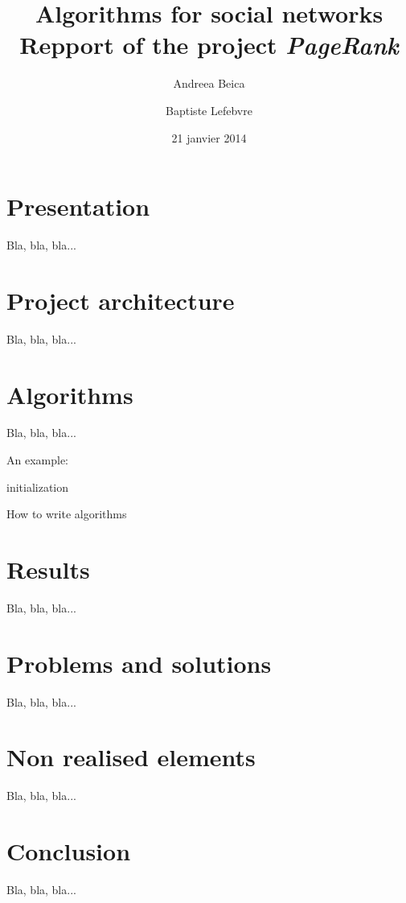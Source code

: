 \documentclass[pdftex,12pt,a4paper]{article}
\begin{document}
\title{
	\Large \textbf{Algorithms for social networks} \\
	\textsf{Repport of the project \emph{PageRank}}
}
\author{Andreea Beica \and Baptiste Lefebvre}
\date{21 janvier 2014}

\maketitle


\section{Presentation}

Bla, bla, bla...


\section{Project architecture}

Bla, bla, bla...


\section{Algorithms}

Bla, bla, bla...

An example:

\begin{algorithm}[H]
	initialization\;
	\caption{How to write algorithms}
\end{algorithm}


\section{Results}

Bla, bla, bla...


\section{Problems and solutions}

Bla, bla, bla...


\section{Non realised elements}

Bla, bla, bla...


\section{Conclusion}

Bla, bla, bla...
\end{document}
